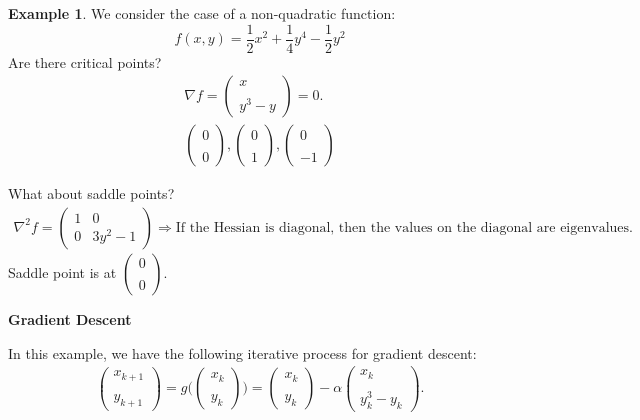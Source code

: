 \documentclass[twoside]{article}
\theoremstyle{definition}
\theoremstyle{definition}
\newtheorem{exmp}{Example}
\theoremstyle{remark}
\begin{document}
\begin{exmp}
We consider the case of a non-quadratic function:
$$f(x,y) = \frac{1}{2} x^2 + \frac{1}{4} y^4 - \frac{1}{2} y^2$$
Are there critical points?
\[
\begin{aligned}
\nabla f = \left(\begin{smallmatrix} x \\ \ \\ y^3 - y \end{smallmatrix}\right) = 0. \\
\left(\begin{smallmatrix} 0 \\ \ \\ 0 \end{smallmatrix}\right), \left(\begin{smallmatrix} 0 \\ \ \\ 1 \end{smallmatrix}\right), \left(\begin{smallmatrix} 0 \\ \ \\ -1 \end{smallmatrix}\right)
\end{aligned}
\]

What about saddle points?
\[
\begin{aligned}
\nabla^2 f = \begin{pmatrix}
1 & 0 \\
0 & 3y^2-1
\end{pmatrix} 
\Rightarrow \text{If the Hessian is diagonal, then the values on the diagonal are eigenvalues.}
\end{aligned}
\]
Saddle point is at $\left(\begin{smallmatrix} 0 \\ \ \\ 0 \end{smallmatrix}\right)$.

\textbf{Gradient Descent}

In this example, we have the following iterative process for gradient descent:
\[
\begin{aligned}
\left(\begin{smallmatrix} x_{k+1} \\ \ \\ y_{k+1} \end{smallmatrix}\right) =
g\Big(\left(\begin{smallmatrix} x_k \\ \ \\ y_k \end{smallmatrix}\right)\Big) =
\left(\begin{smallmatrix} x_{k} \\ \ \\ y_{k} \end{smallmatrix}\right) - \alpha\left(\begin{smallmatrix} x_{k} \\ \ \\ y_{k}^3 - y_k \end{smallmatrix}\right).
\end{aligned}
\]


\end{exmp}
\end{document}
